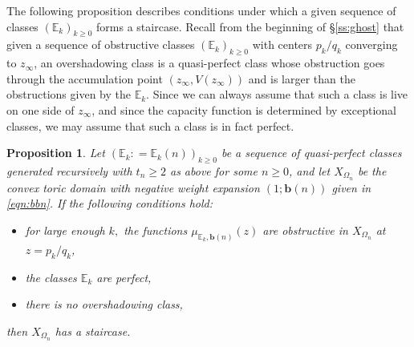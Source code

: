 \documentclass[11pt, reqno]{amsart}
\newtheorem{prop}[thm]{Proposition}
\theoremstyle{remark}
\numberwithin{equation}{subsection}
\numberwithin{figure}{section}
\theoremstyle{customremark}
\newcommand{\bE}{{\mathbb E}}
\begin{document}
The following proposition describes  conditions under which  a given sequence of classes $(\bE_k)_{k\ge 0}$  forms a staircase. 
Recall from  the beginning of \S\ref{ss:ghost} that given a sequence of obstructive classes $(\bE_k)_{k\ge 0}$ with centers $p_k/q_k$ converging to $z_\infty$, an
overshadowing class is a quasi-perfect class whose obstruction goes through the accumulation point $(z_\infty, V(z_\infty))$ and is larger  than the obstructions given by the $\bE_k$. Since we can always assume that such a class is live on one side of $z_\infty$,  
and since the capacity function is determined by exceptional classes, we may assume that such a class is in fact perfect.

\begin{prop} \label{prop:stair}
Let $(\bE_k: = \bE_k(n))_{k\ge 0}$ be a sequence of quasi-perfect classes generated recursively with $t_n \geq 2$ as above for some $n\ge 0$, and let $X_{\Omega_n}$ be the convex toric domain with negative weight expansion $%
(1;\bm{b}(n))$ given in \eqref{eqn:bbn}. If the following conditions hold:
    \begin{itemize}
        \item[{\rm (i)}] for large enough $k,$ the functions $\mu_{\bE_k,\bm{b} (n)}(z)$ are obstructive in $X_{\Omega_n}$ at $z=p_k/q_k$,
        \item[{\rm (ii)}] the classes $\bE_k$ are perfect,
        \item[{\rm (iii)}] there is no overshadowing class, 
    \end{itemize}
    then  $X_{\Omega_n}$ has a staircase. 
\end{prop}
\end{document}
